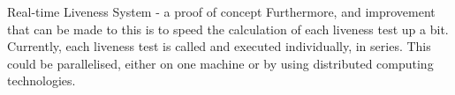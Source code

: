 \documentclass[final]{beamer}
\begin{document}
\begin{frame}{}
\begin{columns}[t]
\begin{column}{.48\linewidth}
\begin{block}{Real-time Liveness System - a proof of concept}
          Furthermore, and improvement that can be made to this is to speed the calculation of each liveness test up a bit. Currently, each liveness test is called and executed individually, in series. This could be parallelised,
          either on one machine or by using distributed computing technologies.
        \end{block}
      \end{column}
    \end{columns}


  \end{frame}
\end{document}
